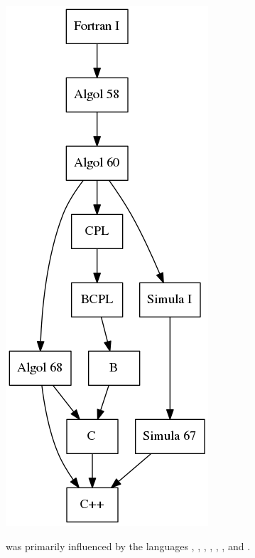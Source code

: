 \documentclass[../languages.tex]{subfiles}
\begin{document}
\begin{Figure}
  \centering
  \includegraphics[height=0.5\textheight]{cpp}
\end{Figure}

 was primarily influenced by the languages , ,
, , , , and .

\newpage
\end{document}
